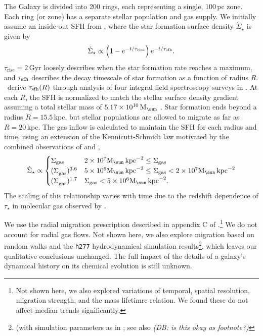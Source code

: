 \documentclass[fleqn,
usenatbib]{mnras}
\newcommand{\JJ}{\citetalias{james+21}}
\newcommand{\Mo}{ {\rm M}_{\sun}}
\newcommand{\dbnote}[1]{ {\color{Thistle} \textit{\small (DB: #1)}} }
\begin{document}
The Galaxy is divided into 200 rings, each representing a single, 100\,pc zone. Each ring (or zone) has a separate stellar population and gas supply. We initially assume an inside-out SFH from \JJ, where the star formation surface density $\dot{\Sigma}_\star$ is given by 
\begin{equation}\label{eq:inside_out}
    \dot{\Sigma}_\star \propto \left(1-e^{-t/\tau_{\rm rise}}\right) e^{-t/\tau_{\rm sfh}}.
\end{equation}
$\tau_\text{rise}=2$\,Gyr loosely describes when the star formation rate reaches a maximum, and $\tau_{\rm sfh}$ describes the decay timescale of star formation as a function of radius $R$. \JJ\ derive $\tau_{\rm sfh}(R)$ through analysis of four integral field spectroscopy surveys in \cite{sanches20}. At each $R$, the SFH is normalized to match the stellar surface density gradient \citep{BHG16} assuming a total stellar mass of $5.17\times10^{10}\,\Mo$ \citep{LM15}. Star formation ends beyond a radius $R=15.5\,$kpc, but stellar populations are allowed to migrate as far as $R=20\,$kpc.  
The gas inflow is calculated to maintain the SFH for each radius and time, using an extension of the Kennicutt-Schmidt law \citep{kennicutt98} motivated by the combined observations of \citet{bigiel+10} and \citet{leroy+13}, 
\begin{equation}
\dot{\Sigma}_{\star} \propto 
\begin{cases}
    {\Sigma}_{\rm gas} & 2\times 10^7 \Mo\,{\rm kpc}^{-2} \leq \Sigma_{\rm gas} \\ 
    {(\Sigma}_{\rm gas})^{3.6} & 5\times 10^6 \Mo\,{\rm kpc}^{-2}\leq \Sigma_{\rm gas} < 2\times10^7 \Mo\,{\rm kpc}^{-2}\\ 
    {(\Sigma}_{\rm gas})^{1.7} & \Sigma_{\rm gas} < 5\times10^6 \Mo\,{\rm kpc}^{-2}.
\end{cases}
\end{equation} 
The scaling of this relationship varies with time due to the redshift dependence of $\tau_\star$ in molecular gas observed by \citet{tacconi18}.


We use the radial migration prescription described in appendix C of \citet{dubay+24}.\footnote{Not shown here, we also explored variations of temporal, spatial resolution, migration strength, and the mass lifetimre relation. We found these do not affect median trends significantly.}
We do not account for radial gas flows.
Not shown here, we also explore migration based on random walks and the \texttt{h277} hydrodynamical
simulation results\footnote{(with simulation parameters as in \citealt{bird+21}; see also \citealt{christensen12, zolotov12, loebman12, BZ14} \dbnote{is this okay as footnote?} }, which leaves our qualitative conclusions unchanged. 
The full impact of the details of a galaxy's dynamical history on its chemical evolution is still unknown.
\end{document}
